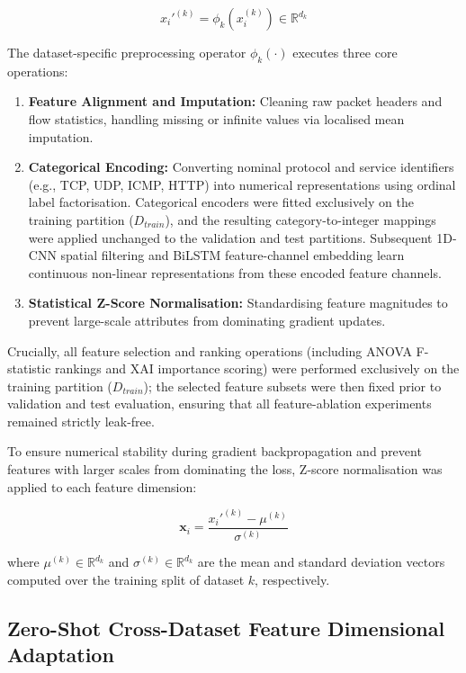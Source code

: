 \documentclass[a4paper,fleqn]{cas-sc}
\begin{document}
\begin{equation}
x_i'^{(k)} = \phi_k(x_i^{(k)}) \in \mathbb{R}^{d_k}
\end{equation}

The dataset-specific preprocessing operator $\phi_k(\cdot)$ executes three core operations:
\begin{enumerate}
    \item \textbf{Feature Alignment and Imputation:} Cleaning raw packet headers and flow statistics, handling missing or infinite values via localised mean imputation.
    \item \textbf{Categorical Encoding:} Converting nominal protocol and service identifiers (e.g., TCP, UDP, ICMP, HTTP) into numerical representations using ordinal label factorisation. Categorical encoders were fitted exclusively on the training partition ($D_{train}$), and the resulting category-to-integer mappings were applied unchanged to the validation and test partitions. Subsequent 1D-CNN spatial filtering and BiLSTM feature-channel embedding learn continuous non-linear representations from these encoded feature channels.
    \item \textbf{Statistical Z-Score Normalisation:} Standardising feature magnitudes to prevent large-scale attributes from dominating gradient updates.
\end{enumerate}

Crucially, all feature selection and ranking operations (including ANOVA F-statistic rankings and XAI importance scoring) were performed exclusively on the training partition ($D_{train}$); the selected feature subsets were then fixed prior to validation and test evaluation, ensuring that all feature-ablation experiments remained strictly leak-free.

To ensure numerical stability during gradient backpropagation and prevent features with larger scales from dominating the loss, Z-score normalisation was applied to each feature dimension:

\begin{equation}
\mathbf{x}_i = \frac{x_i'^{(k)} - \mu^{(k)}}{\sigma^{(k)}}
\end{equation}

where $\mu^{(k)} \in \mathbb{R}^{d_k}$ and $\sigma^{(k)} \in \mathbb{R}^{d_k}$ are the mean and standard deviation vectors computed over the training split of dataset $k$, respectively.

\subsection{Zero-Shot Cross-Dataset Feature Dimensional Adaptation}
\end{document}
